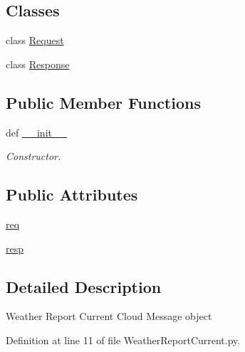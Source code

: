 \subsection*{Classes}
\begin{DoxyCompactItemize}
\item 
class \hyperlink{classRappCloud_1_1CloudMsgs_1_1WeatherReportCurrent_1_1WeatherReportCurrent_1_1Request}{Request}
\item 
class \hyperlink{classRappCloud_1_1CloudMsgs_1_1WeatherReportCurrent_1_1WeatherReportCurrent_1_1Response}{Response}
\end{DoxyCompactItemize}
\subsection*{Public Member Functions}
\begin{DoxyCompactItemize}
\item 
def \hyperlink{classRappCloud_1_1CloudMsgs_1_1WeatherReportCurrent_1_1WeatherReportCurrent_a737dc652a49805f2f6b14412bb6de145}{\-\_\-\-\_\-init\-\_\-\-\_\-}
\begin{DoxyCompactList}\small\item\em Constructor. \end{DoxyCompactList}\end{DoxyCompactItemize}
\subsection*{Public Attributes}
\begin{DoxyCompactItemize}
\item 
\hyperlink{classRappCloud_1_1CloudMsgs_1_1WeatherReportCurrent_1_1WeatherReportCurrent_a3fbe00a0725821edd4f8bd6fee657751}{req}
\item 
\hyperlink{classRappCloud_1_1CloudMsgs_1_1WeatherReportCurrent_1_1WeatherReportCurrent_a82bdfd470647e7a2af126749ffb372b8}{resp}
\end{DoxyCompactItemize}


\subsection{Detailed Description}
\begin{DoxyVerb}Weather Report Current Cloud Message object \end{DoxyVerb}
 

Definition at line 11 of file Weather\-Report\-Current.\-py.




